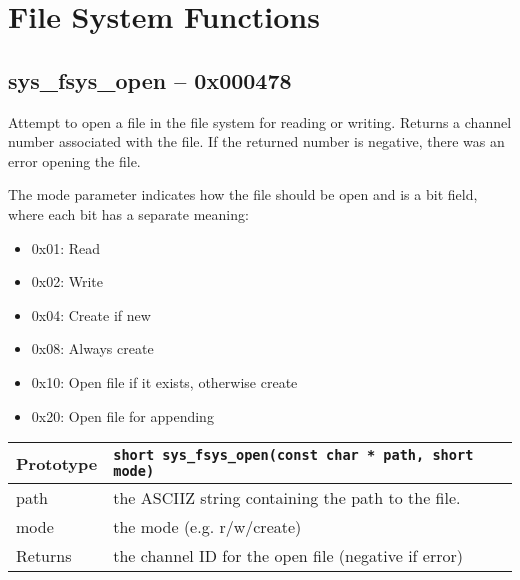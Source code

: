 \section{File System Functions}



\subsection*{sys\_fsys\_open -- 0x000478}
Attempt to open a file in the file system for reading or writing.
Returns a channel number associated with the file.
If the returned number is negative, there was an error opening the file.

The mode parameter indicates how the file should be open and is a bit field, where each bit has a separate meaning:
\begin{itemize}
    \item 0x01: Read
    \item 0x02: Write
    \item 0x04: Create if new
    \item 0x08: Always create
    \item 0x10: Open file if it exists, otherwise create
    \item 0x20: Open file for appending
\end{itemize}

\bigskip		

\begin{tabular}{|l||l|} \hline
Prototype & \lstinline!short sys_fsys_open(const char * path, short mode)! \\ \hline
path & the ASCIIZ string containing the path to the file. \\ \hline
mode & the mode (e.g. r/w/create) \\ \hline
Returns & the channel ID for the open file (negative if error) \\ \hline
\end{tabular}

